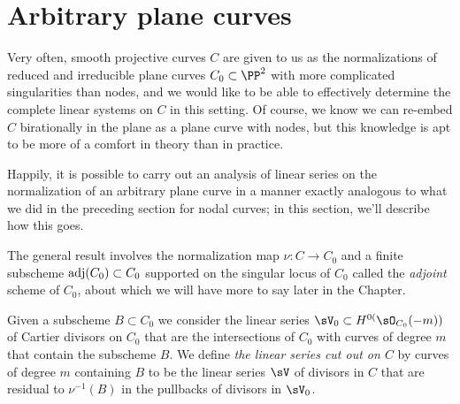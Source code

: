 \section{Arbitrary plane curves} \label{arbitrary plane curves}



Very often, smooth projective curves $C$ are given to us as the normalizations of reduced and irreducible plane curves $C_0 \subset \PP^2$ with more complicated singularities than nodes, and we would like to be able to effectively determine the complete linear systems on $C$ in this setting. Of course, we know we can re-embed $C$ birationally in the plane as a plane curve with nodes, but this knowledge is apt to be more of a comfort in theory than in practice.

Happily, it is possible to carry out an analysis of linear series on the normalization of an arbitrary plane curve in a manner exactly analogous to what we did in the preceding section for nodal curves; in this section, we'll describe how this goes. 

The general result
involves the normalization map $\nu: C\to C_{0}$ and a finite subscheme  $\adj(C_{0})\subset C_{0}$ supported on the singular locus of $C_{0}$ called the 
\emph{adjoint} scheme of $C_{0}$, about which we will have more to say later in the Chapter. 

Given a 
subscheme $B\subset C_{0}$ we consider the linear series $\sV_{0}\subset H^{0(}\sO_{C_{0}}(-m))$ of Cartier divisors on $C_{0}$ that are the intersections
of $C_{0}$ with curves of  degree $m$ that contain the subscheme $B$. We define \emph{the linear series cut out on $C$} by curves of degree $m$
containing $B$ to be the linear series  $\sV$ of divisors in $C$ that are residual to $\nu^{-1}(B)$ in the pullbacks 
of divisors in $\sV_{0}$.

